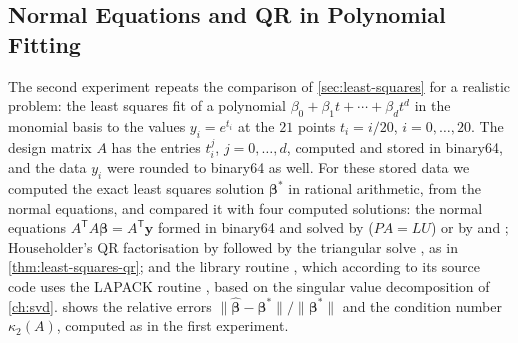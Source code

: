 \subsection{Normal Equations and QR in Polynomial Fitting}

The second experiment repeats the comparison of \cref{sec:least-squares} for a realistic problem: the least squares fit of a polynomial $\beta_0+\beta_1t+\cdots+\beta_dt^d$ in the monomial basis to the values $y_i=e^{t_i}$ at the $21$ points $t_i=i/20$, $i=0,\ldots,20$. The design matrix $A$ has the entries $t_i^j$, $j=0,\ldots,d$, computed and stored in binary64, and the data $y_i$ were rounded to binary64 as well. For these stored data we computed the exact least squares solution $\boldsymbol\beta^*$ in rational arithmetic, from the normal equations, and compared it with four computed solutions: the normal equations $A^{\mathsf T}A\boldsymbol\beta=A^{\mathsf T}\mathbf y$ formed in binary64 and solved by  ($PA=LU$) or by  and ; Householder's QR factorisation by  followed by the triangular solve , as in \cref{thm:least-squares-qr}; and the library routine , which according to its source code uses the LAPACK routine , based on the singular value decomposition of \cref{ch:svd}.  shows the relative errors $\|\hat{\boldsymbol\beta}-\boldsymbol\beta^*\|/\|\boldsymbol\beta^*\|$ and the condition number $\kappa_2(A)$, computed as in the first experiment.

